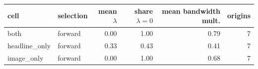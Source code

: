 \begin{tabular}{llrrrr}
\toprule
cell & selection & mean $\lambda$ & share $\lambda=0$ & mean bandwidth mult. & origins \\
\midrule
both & forward & 0.00 & 1.00 & 0.79 & 7 \\
headline\_only & forward & 0.33 & 0.43 & 0.41 & 7 \\
image\_only & forward & 0.00 & 1.00 & 0.68 & 7 \\
\bottomrule
\end{tabular}
